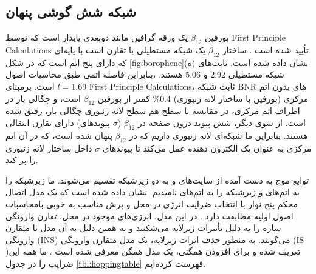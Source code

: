 \subsection{شبکه شش گوشی پنهان}
‌بورفین $\beta_{12}$ یک ورقه گرافین مانند دوبعدی پایدار است که توسط \gls{First Principle Calculations} تأیید شده است \cite{fengDiracFermionsBorophene2017}. ساختار $\beta_{12}$ یک شبکه مستطیلی با تقارن  است با پایه‌ای که دارای پنج اتم است که در شکل \ref{fig:borophene}(ه) نشان داده شده است. ثابت‌های شبکه مستطیلی \lr{\AA}2.92 و \lr{\AA}5.06 هستند. \cite{zhangBoropheneExtremelyHigh2016}،بنابراین فاصله اتمی‌‌   طبق محاسبات اصول \lr{\AA} $l=1.69$ است. برمبنای \gls{First Principle Calculations}، ثابت شبکه \gls{BNR}‌ های بدون اتم مرکزی (‌بورفین با ساختار لانه زنبوری) 0.4\% کمتر از ‌بورفین $\beta_{12}$ است، و چگالی بار در اطراف اتم مرکزی، در مقایسه با سطح هم سطح لانه زنبوری چگالی بار، رقیق شده است. از سوی دیگر، شش پیوند درون صفحه در $\beta_{12}$ ($\sigma$ پیوندهای) دارای تقارن انتقالی هستند. بنابراین ما شبکه‌ای لانه زنبوری داریم که در $\beta_{12}$ پنهان شده است، که در آن اتم مرکزی به عنوان یک الکترون دهنده عمل ‌‌می‌‌کند تا پیوندهای $\sigma$ داخل ساختار لانه زنبوری را پر کند. 


توابع موج به دست آمده از سایت‌های  و  به دو زیرشبکه تقسیم ‌‌می‌‌شوند. ما زیرشبکه  را به اتم‌های  و زیرشبکه  را به اتم‌های  نا‌میدیم. نشان داده شده است که یک مدل اتصال محکم پنج نوار با انتخاب ضرایب انرژی در محل و پرش مناسب به خوبی با\gls{محاسبات اصول اولیه} مطابقت دارد \cite{nakhaeeTightbindingModelBorophene2018, fengDiracFermionsBorophene2017}. در این مدل، انرژی‌های موجود در محل، تقارن وارونگی سازه را به دلیل تأثیرات زیرلایه  ‌‌می‌‌شکنند و به همین دلیل به آن مدل نا متقارن وارونگی (\gls{INS}) ‌‌می‌‌گویند. به منظور حذف اثرات زیرلایه، یک مدل متقارن وارونگی (\gls{IS} )تعریف شده و برای افزودن همگنی، یک مدل همگن معرفی شده است \cite{ezawaTripletFermionsDirac2017}. ما همه این ضرایب را در جدول \ref{tbl:hoppingtable} فهرست کرده‌ایم.

